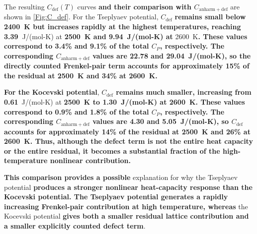 \documentclass[preprint,12pt,sort&compress]{elsarticle}
\newcommand{\?}{\stackrel{?}{=}}
\providecommand{\DIFaddtex}[1]{{\bf #1}} %
\providecommand{\DIFdeltex}[1]{} %
\providecommand{\DIFaddbegin}{\protect\color{blue}} %
\providecommand{\DIFaddend}{\protect\color{black}} %
\providecommand{\DIFdelbegin}{\protect\color{red}} %
\providecommand{\DIFdelend}{\protect\color{black}} %
\providecommand{\DIFadd}[1]{\texorpdfstring{\DIFaddtex{#1}}{#1}} %
\providecommand{\DIFdel}[1]{\texorpdfstring{\DIFdeltex{#1}}{}} %
\newcommand{\DIFscaledelfig}{0.5}
\newlength{\DIFdelgraphicswidth} %
\newlength{\DIFdelgraphicsheight} %
\newcommand{\DIFaddincludegraphics}[2][]{{\color{blue}\fbox{\DIFOincludegraphics[#1]{#2}}}} %
\newcommand{\DIFdelincludegraphics}[2][]{%
\sbox{\DIFdelgraphicsbox}{\DIFOincludegraphics[#1]{#2}}%
\settoboxwidth{\DIFdelgraphicswidth}{\DIFdelgraphicsbox} %
\settoboxtotalheight{\DIFdelgraphicsheight}{\DIFdelgraphicsbox} %
\scalebox{\DIFscaledelfig}{%
\parbox[b]{\DIFdelgraphicswidth}{\usebox{\DIFdelgraphicsbox}\\[-\baselineskip] \rule{\DIFdelgraphicswidth}{0em}}\llap{\resizebox{\DIFdelgraphicswidth}{\DIFdelgraphicsheight}{%
\setlength{\unitlength}{\DIFdelgraphicswidth}%
\begin{picture}(1,1)%
\thicklines\linethickness{2pt} %
{\color[rgb]{1,0,0}\put(0,0){\framebox(1,1){}}}%
{\color[rgb]{1,0,0}\put(0,0){\line( 1,1){1}}}%
{\color[rgb]{1,0,0}\put(0,1){\line(1,-1){1}}}%
\end{picture}%
}\hspace*{3pt}}} %
} %
\DeclareRobustCommand{\DIFaddbegin}{\DIFOaddbegin \let\includegraphics\DIFaddincludegraphics} %
\DeclareRobustCommand{\DIFaddend}{\DIFOaddend \let\includegraphics\DIFOincludegraphics} %
\DeclareRobustCommand{\DIFdelbegin}{\DIFOdelbegin \let\includegraphics\DIFdelincludegraphics} %
\DeclareRobustCommand{\DIFdelend}{\DIFOaddend \let\includegraphics\DIFOincludegraphics} %
\begin{document}
The resulting $C_{\mathrm{def}}(T)$ curves \DIFaddbegin \DIFadd{and their comparison with $C_{\mathrm{anharm+def}}$ }\DIFaddend are shown in \cref{Fig:C_def}. For the Tseplyaev potential, $C_{\mathrm{def}}$ \DIFdelbegin \DIFdel{reaches $\sim$10~}\DIFdelend \DIFaddbegin \DIFadd{remains small below 2400~K but increases rapidly at the highest temperatures, reaching 3.39~}\DIFaddend J/(mol-K) at \DIFaddbegin \DIFadd{2500~K and 9.94~J/(mol-K) at }\DIFaddend 2600~K\DIFaddbegin \DIFadd{. These values correspond to 3.4\% and 9.1\% of the total $C_P$, respectively. The corresponding $C_{\mathrm{anharm+def}}$ values are 22.78 and 29.04~J/(mol-K), so the directly counted Frenkel-pair term accounts for approximately 15\% of the residual at 2500~K and 34\% at 2600~K. 
}

\DIFadd{For the Kocevski potential}\DIFaddend , \DIFdelbegin \DIFdel{whereas for the Kocevski potential it remains on the order of 1}\DIFdelend \DIFaddbegin \DIFadd{$C_{\mathrm{def}}$ remains much smaller, increasing from 0.61}\DIFaddend ~J/(mol-K) at \DIFdelbegin \DIFdel{the same temperature. Thus, the order-of-magnitude difference in Frenkel-pair concentration between the two potentials translates into an order-of-magnitude difference in the defect contribution to the heat capacity. This might provide an }\DIFdelend \DIFaddbegin \DIFadd{2500~K to 1.30~J/(mol-K) at 2600~K. These values correspond to 0.9\% and 1.8\% of the total $C_P$, respectively. The corresponding $C_{\mathrm{anharm+def}}$ values are 4.30 and 5.05~J/(mol-K), so $C_{\mathrm{def}}$ accounts for approximately 14\% of the residual at 2500~K and 26\% at 2600~K. Thus, although the defect term is not the entire heat capacity or the entire residual, it becomes a substantial fraction of the high-temperature nonlinear contribution.
}

\DIFadd{This comparison provides a possible }\DIFaddend explanation for why the Tseplyaev potential \DIFdelbegin \DIFdel{reproduces the strong curvature of the Hayes correlation, while }\DIFdelend \DIFaddbegin \DIFadd{produces a stronger nonlinear heat-capacity response than the Kocevski potential. The Tseplyaev potential generates a rapidly increasing Frenkel-pair contribution at high temperature, whereas }\DIFaddend the Kocevski potential \DIFdelbegin \DIFdel{yields a nearly linear $C_{P}(T)$: the latter underestimates the magnitude of the Frenkel-pair contribution and therefore fails to reproduce the superlinear component in $C_P(T)$}\DIFdelend \DIFaddbegin \DIFadd{gives both a smaller residual lattice contribution and a smaller explicitly counted defect term}\DIFaddend .
\end{document}
